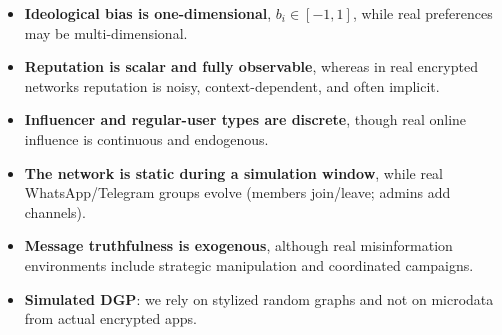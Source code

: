 \begin{itemize}
    \item \textbf{Ideological bias is one-dimensional}, $b_i \in [-1,1]$, while real preferences may be multi-dimensional.
    \item \textbf{Reputation is scalar and fully observable}, whereas in real encrypted networks reputation is noisy, context-dependent, and often implicit.
    \item \textbf{Influencer and regular-user types are discrete}, though real online influence is continuous and endogenous.
    \item \textbf{The network is static during a simulation window}, while real WhatsApp/Telegram groups evolve (members join/leave; admins add channels).
    \item \textbf{Message truthfulness is exogenous}, although real misinformation environments include strategic manipulation and coordinated campaigns.
    \item \textbf{Simulated DGP}: we rely on stylized random graphs and not on microdata from actual encrypted apps.
\end{itemize}


